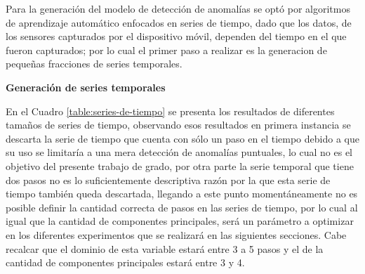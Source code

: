 




\vspace{5mm} %

Para la generaci\'{o}n del modelo de detecci\'{o}n de anomal\'{i}as se opt\'{o} por algoritmos de aprendizaje autom\'{a}tico enfocados en series de tiempo, dado que los datos, de los sensores capturados por el dispositivo m\'{o}vil, dependen del tiempo en el que fueron capturados; por lo cual el primer paso a realizar es la generacion de peque\~{n}as fracciones de series temporales. 

\textbf{Generaci\'{o}n de series temporales}

\vspace{5mm} %

En el Cuadro \ref{table:series-de-tiempo} se presenta los resultados de diferentes tama\~{n}os de series de tiempo, observando esos resultados en primera instancia se descarta la serie de tiempo que cuenta con s\'{o}lo un paso en el tiempo debido a que su uso se limitar\'{i}a a una mera detecci\'{o}n de anomal\'{i}as puntuales, lo cual no es el objetivo del presente trabajo de grado, por otra parte la serie temporal que tiene dos pasos no es lo suficientemente descriptiva raz\'{o}n por la que esta serie de tiempo tambi\'{e}n queda descartada, llegando a este punto moment\'{a}neamente no es posible definir la cantidad correcta de pasos en las series de tiempo, por lo cual al igual que la cantidad de componentes principales, ser\'{a} un par\'{a}metro a optimizar en los diferentes experimentos que se realizar\'{a} en las siguientes secciones. Cabe recalcar que el dominio de esta variable estar\'{a} entre 3 a 5 pasos y el de la cantidad de componentes principales estar\'{a} entre 3 y 4.

